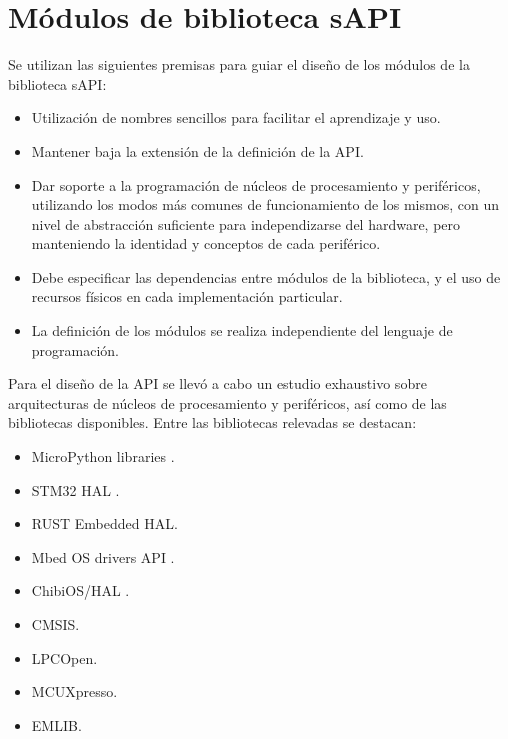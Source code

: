 \section{Módulos de biblioteca sAPI}
\label{sec:modelLibrary}

Se utilizan las siguientes premisas para guiar el diseño de los módulos de la biblioteca sAPI:

\begin{itemize}
\item
Utilización de nombres sencillos para facilitar el aprendizaje y uso.
\item
Mantener baja la extensión de la definición de la API.
\item
Dar soporte a la programación de núcleos de procesamiento y periféricos, utilizando los modos más comunes de funcionamiento de los mismos, con un nivel de abstracción suficiente para independizarse del hardware, pero manteniendo la identidad y conceptos de cada periférico.
\item
Debe especificar las dependencias entre módulos de la biblioteca, y el uso de recursos físicos en cada implementación particular.
\item
La definición de los módulos se realiza independiente del lenguaje de programación.
\end{itemize}

Para el diseño de la API se llevó a cabo un estudio exhaustivo sobre arquitecturas de núcleos de procesamiento y periféricos, así como de las bibliotecas disponibles. Entre las bibliotecas relevadas se destacan:

\begin{itemize}
\item
MicroPython libraries \citep{MicroPythonLib}. %
\item
STM32 HAL \citep{STM32hal}. %
\item
RUST Embedded HAL\citep{RUSTEmbeddedHAL}. %
\item
Mbed OS drivers API \citep{MbedOSdrivers}. %
\item
ChibiOS/HAL \citep{ChibiOShal}. %
\item
CMSIS.
\item
LPCOpen.
\item
MCUXpresso.
\item
EMLIB. %
\end{itemize}

